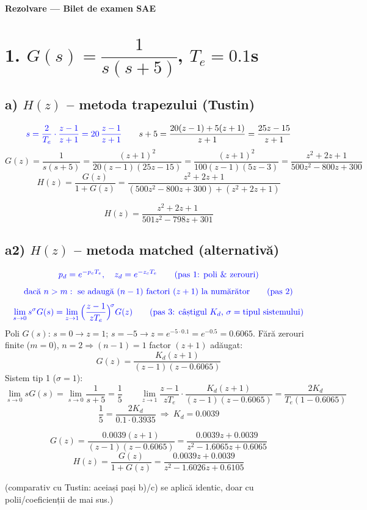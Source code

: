 \documentclass[10pt,a4paper]{article}
\begin{document}
\begin{center}
{\large\bfseries Rezolvare --- Bilet de examen SAE}
\end{center}
\vspace{-0.2cm}

\section*{1. $G(s)=\dfrac{1}{s(s+5)}$, $T_e=0.1$s}

\subsection*{a) $H(z)$ -- metoda trapezului (Tustin)}
$$\textcolor{blue}{s=\frac2{T_e}\cdot\frac{z-1}{z+1}=20\,\frac{z-1}{z+1}}\qquad s+5=\frac{20(z-1)+5(z+1)}{z+1}=\frac{25z-15}{z+1}$$
$$G(z)=\frac1{s(s+5)}=\frac{(z+1)^2}{20(z-1)(25z-15)}=\frac{(z+1)^2}{100(z-1)(5z-3)}=\frac{z^2+2z+1}{500z^2-800z+300}$$
$$H(z)=\frac{G(z)}{1+G(z)}=\frac{z^2+2z+1}{(500z^2-800z+300)+(z^2+2z+1)}$$
\begin{res}
$$H(z)=\frac{z^2+2z+1}{501z^2-798z+301}$$
\end{res}

\subsection*{a2) $H(z)$ -- metoda matched (alternativă)}
$$\color{blue}p_d=e^{-p_cT_e},\quad z_d=e^{-z_cT_e}\qquad\text{(pas 1: poli \& zerouri)}$$
$$\color{blue}\text{dacă }n>m:\text{ se adaugă }(n-1)\text{ factori }(z+1)\text{ la numărător}\qquad\text{(pas 2)}$$
$$\color{blue}\lim_{s\to0}s^\sigma G(s)=\lim_{z\to1}\Big(\frac{z-1}{zT_e}\Big)^{\!\sigma}G(z)\qquad\text{(pas 3: câștigul }K_d\text{, }\sigma=\text{tipul sistemului)}$$
Poli $G(s)$: $s=0\to z=1$; $s=-5\to z=e^{-5\cdot0.1}=e^{-0.5}=0.6065$. Fără zerouri finite ($m=0$), $n=2\Rightarrow(n-1)=1$ factor $(z+1)$ adăugat:
$$G(z)=\frac{K_d(z+1)}{(z-1)(z-0.6065)}$$
Sistem tip 1 ($\sigma=1$):
$$\lim_{s\to0}sG(s)=\lim_{s\to0}\frac1{s+5}=\frac15\qquad
\lim_{z\to1}\frac{z-1}{zT_e}\cdot\frac{K_d(z+1)}{(z-1)(z-0.6065)}=\frac{2K_d}{T_e(1-0.6065)}$$
$$\frac15=\frac{2K_d}{0.1\cdot0.3935}\ \Rightarrow\ K_d=0.0039$$
\begin{res}
$$G(z)=\frac{0.0039(z+1)}{(z-1)(z-0.6065)}=\frac{0.0039z+0.0039}{z^2-1.6065z+0.6065}$$
$$H(z)=\frac{G(z)}{1+G(z)}=\frac{0.0039z+0.0039}{z^2-1.6026z+0.6105}$$
\end{res}
(comparativ cu Tustin: aceiași pași b)/c) se aplică identic, doar cu polii/coeficienții de mai sus.)
\end{document}
